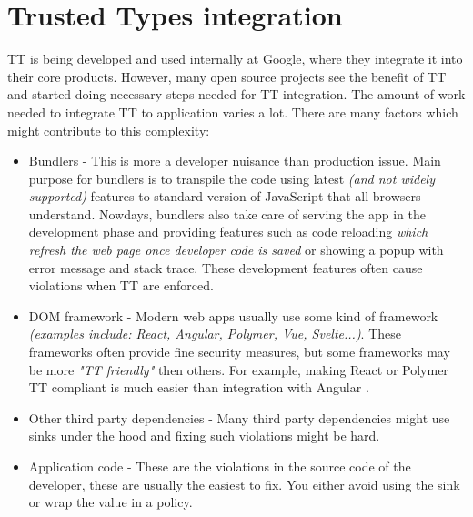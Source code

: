 \section{Trusted Types integration}

TT is being developed and used internally at Google, where they integrate it into their core
products. However, many open source projects see the benefit of TT and started doing necessary steps
needed for TT integration. The amount of work needed to integrate TT to application varies a lot.
There are many factors which might contribute to this complexity:

\begin{itemize}
  \item  Bundlers - This is more a developer nuisance than production issue. Main purpose for
        bundlers is to transpile the code using latest \emph{(and not widely supported)} features to
        standard version of JavaScript that all browsers understand. Nowdays, bundlers also take
        care of serving the app in the development phase and providing features such as code
        reloading \emph{which refresh the web page once developer code is saved} or showing a popup
        with error message and stack trace. These development features often cause violations when
        TT are enforced.
  \item DOM framework - Modern web apps usually use some kind of framework \emph{(examples include:
          React, Angular, Polymer, Vue, Svelte...)}. These frameworks often provide fine security
        measures, but some frameworks may be more \emph{"TT friendly"} then others. For example,
        making React or Polymer TT compliant is much easier than integration with Angular
        \cite{react_tt_integration} \cite{polymer_tt_integration} \cite{angular_tt_integration}.
  \item Other third party dependencies - Many third party dependencies might use sinks under the
        hood and fixing such violations might be hard.
  \item Application code - These are the violations in the source code of the developer, these are
        usually the easiest to fix. You either avoid using the sink or wrap the value in a policy.
\end{itemize}
